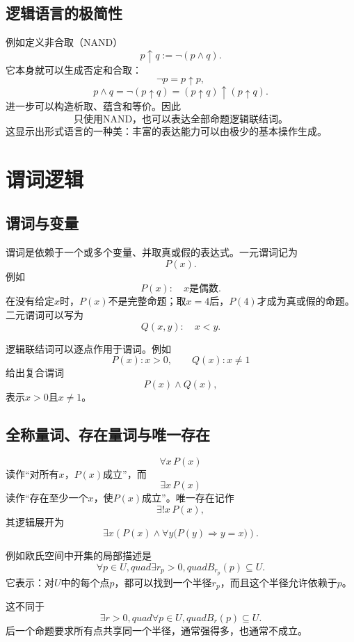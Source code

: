 \subsection{逻辑语言的极简性}

例如定义非合取（NAND）
\[
    p\mathbin{\uparrow}q:=\neg(p\land q).
\]
它本身就可以生成否定和合取：
\[
    \neg p=p\mathbin{\uparrow}p,
\]
\[
    p\land q
    =\neg(p\mathbin{\uparrow}q)
    =(p\mathbin{\uparrow}q)\mathbin{\uparrow}
    (p\mathbin{\uparrow}q).
\]
进一步可以构造析取、蕴含和等价。因此
\[
    \boxed{\text{只使用NAND，也可以表达全部命题逻辑联结词。}}
\]
这显示出形式语言的一种美：丰富的表达能力可以由极少的基本操作生成。


\section{谓词逻辑}

\subsection{谓词与变量}

谓词是依赖于一个或多个变量、并取真或假的表达式。一元谓词记为
\[
    P(x).
\]
例如
\[
    P(x):\quad x\text{是偶数}.
\]
在没有给定$x$时，$P(x)$不是完整命题；取$x=4$后，$P(4)$才成为真或假的命题。二元谓词可以写为
\[
    Q(x,y):\quad x<y.
\]

逻辑联结词可以逐点作用于谓词。例如
\[
    P(x):x>0,
    \qquad
    Q(x):x\neq1
\]
给出复合谓词
\[
    P(x)\land Q(x),
\]
表示$x>0$且$x\neq1$。

\subsection{全称量词、存在量词与唯一存在}

\[
    \forall x\,P(x)
\]
读作“对所有$x$，$P(x)$成立”，而
\[
    \exists x\,P(x)
\]
读作“存在至少一个$x$，使$P(x)$成立”。唯一存在记作
\[
    \exists!x\,P(x),
\]
其逻辑展开为
\[
    \exists x\left(P(x)\land
    \forall y\bigl(P(y)\Rightarrow y=x\bigr)\right).
\]

例如欧氏空间中开集的局部描述是
\[
    \forall p\in U,quad
    \exists r_p>0,quad
    B_{r_p}(p)\subseteq U.
\]
它表示：对$U$中的每个点$p$，都可以找到一个半径$r_p$，而且这个半径允许依赖于$p$。

这不同于
\[
    \exists r>0,quad
    \forall p\in U,quad
    B_r(p)\subseteq U.
\]
后一个命题要求所有点共享同一个半径，通常强得多，也通常不成立。

